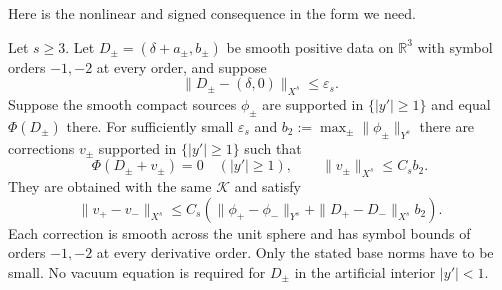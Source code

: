Here is the nonlinear and signed consequence in the form we need.

\begin{lemma}\label{prep:constraint-pair}
Let $s\ge3$.  Let $D_\pm=(\delta+a_\pm,b_\pm)$ be smooth positive
data on $\mathbb R^3$ with symbol orders $-1,-2$ at every order, and
suppose
\[
 \|D_\pm-(\delta,0)\|_{X^s}\le\varepsilon_s.
\]
Suppose the smooth compact sources $\phi_\pm$ are supported in
$\{|y'|\ge1\}$ and equal $\Phi(D_\pm)$ there.  For sufficiently
small $\varepsilon_s$ and $b_2:=\max_\pm\|\phi_\pm\|_{Y^s}$ there
are corrections $v_\pm$ supported in $\{|y'|\ge1\}$ such that
\[
 \Phi(D_\pm+v_\pm)=0\quad (|y'|\ge1),\qquad
 \|v_\pm\|_{X^s}\le C_s b_2.
\]
They are obtained with the same $\mathcal K$ and satisfy
\begin{equation}\label{prep:abstract-odd-correction}
 \|v_+-v_-\|_{X^s}
 \le C_s\left(\|\phi_+-\phi_-\|_{Y^s}
                  +\|D_+-D_-\|_{X^s}b_2\right).
\end{equation}
Each correction is smooth across the unit sphere and has symbol
bounds of orders $-1,-2$ at every derivative order.  Only the stated
base norms have to be small.  No vacuum equation is required for
$D_\pm$ in the artificial interior $|y'|<1$.
\end{lemma}

